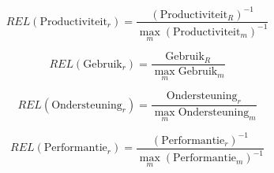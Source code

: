 \begin{equation}
  REL(\text{Productiviteit}_r) = \frac{\left(\text{Productiviteit}_R\right)^{-1}}{\max_{m}{\left(\text{Productiviteit}_m\right)^{-1}}}
  \label{eq:rel-productiviteit}
\end{equation}

\begin{equation}
  REL(\text{Gebruik}_r) = \frac{\text{Gebruik}_R}{\max_{m}{\text{Gebruik}_m}}
  \label{eq:rel-gebruik}
\end{equation}

\begin{equation}
  REL(\text{Ondersteuning}_r) = \frac{\text{Ondersteuning}_r}{\max_{m}{\text{Ondersteuning}_m}}
  \label{eq:rel-ondersteuning}
\end{equation}

\begin{equation}
  REL(\text{Performantie}_r)= \frac{\left(\text{Performantie}_r\right)^{-1}}{\max_{m}{\left(\text{Performantie}_m\right)^{-1}}}
  \label{eq:rel-performantie}
\end{equation}
